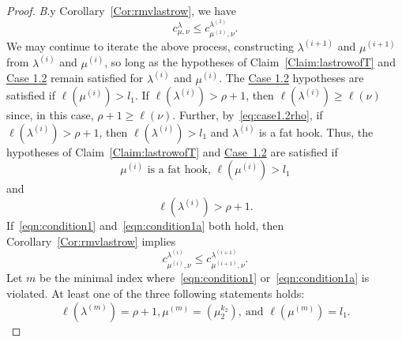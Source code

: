 \documentclass[ALCO,ThmDefs,Unicode,epreuves]{cedram}
\let\hyperlinka\hyperlink %
\newenvironment{Case}[1]{\par\vskip2pt\noindent%
\emph{#1}.}{\vskip2pt}
\begin{document}
\begin{proof}
\begin{Case}
By Corollary~\ref{Cor:rmvlastrow}, we have
\begin{equation}
\label{eq:firstiterationbound}
c^{\lambda}_{\mu,\nu} \leq c^{\lambda^{(1)}}_{\mu^{(1)},\nu}.
\end{equation}
We may continue to iterate the above process, constructing $\lambda^{(i+1)}$ and $\mu^{(i+1)}$ from $\lambda^{(i)}$ and $\mu^{(i)}$, so long as the hypotheses of Claim~\ref{Claim:lastrowofT} and %
\hyperlinka{theo4.6_case1.2}{Case 1.2} remain satisfied for $\lambda^{(i)}$ and $\mu^{(i)}$. The \hyperlinka{theo4.6_case1.2}{Case 1.2} hypotheses are satisfied if $\ell(\mu^{(i)}) > l_1$. If $\ell(\lambda^{(i)}) > \rho + 1$, then $\ell(\lambda^{(i)}) \geq \ell(\nu)$ since, in this case, $\rho + 1 \geq \ell(\nu)$. Further, by~\eqref{eq:case1.2rho}, if $\ell(\lambda^{(i)}) > \rho + 1$, then $\ell(\lambda^{(i)}) > l_1$ and $\lambda^{(i)}$ is a fat hook. Thus, the hypotheses of Claim~\ref{Claim:lastrowofT} and \hyperlinka{theo4.6_case1.2}{Case~1.2} are satisfied if 
\begin{equation}\label{eqn:condition1}
 \mu^{(i)}\text{ is a fat hook, }\ell(\mu^{(i)}) > l_1
\end{equation}
and 
\begin{equation}\label{eqn:condition1a}
 \ell(\lambda^{(i)}) > \rho+1 .
\end{equation}
If~\eqref{eqn:condition1} and~\eqref{eqn:condition1a} both hold, then Corollary~\ref{Cor:rmvlastrow} implies
\begin{equation}\label{eqn:increase}
 c^{\lambda^{(i)}}_{\mu^{(i)},\nu} \leq c^{\lambda^{(i+1)}}_{\mu^{(i+1)},\nu}.
\end{equation}
Let $m$ be the minimal index where~\eqref{eqn:condition1} or~\eqref{eqn:condition1a} is violated. At least one of the three following statements holds: 
\[
\ell(\lambda^{(m)}) = \rho+1, \mu^{(m)} = (\mu_2^{k_2}),\ \text{and } \ell(\mu^{(m)}) = l_1.
\]


\end{Case}
\end{proof}
\end{document}
